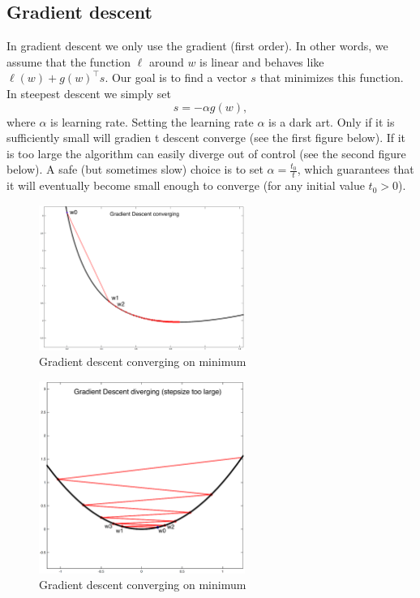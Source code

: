 \subsection{Gradient descent}
In gradient descent we only use the gradient (first order). 
In other words, we assume that the function $\ell$ around $w$ is linear and behaves like 
$\ell(w)+g(w)^{\top}s$. Our goal is to find a vector $s$ that minimizes this function. 
In steepest descent we simply set
\begin{equation}
	\label{equ:delta_weights}
	s=-\alpha g(w),
\end{equation}
where $\alpha$ is learning rate.
Setting the learning rate $\alpha$ is a dark art. Only if it is sufficiently small will gradien
t descent converge (see the first figure below).
If it is too large the algorithm can easily diverge out of control (see the second figure below).
A safe (but sometimes slow) choice is to set $\alpha = \frac{t_{0}}{t}$, which guarantees that it
will eventually become small enough to converge (for any initial value $t_{0}>0$). 
\begin{figure}[htb] 
	\label{fig:gradient_converge}
	\centering
	\includegraphics[width=0.6\textwidth]{figures/gradient_converge}
	\caption{Gradient descent converging on minimum}
\end{figure}
\begin{figure}[htb] 
	\label{fig:gradient_skip}
	\centering
	\includegraphics[width=0.6\textwidth]{figures/gradient_skip}
	\caption{Gradient descent converging on minimum}
\end{figure}


